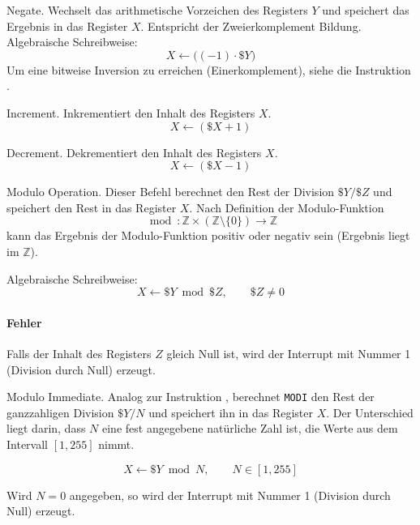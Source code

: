 \glqq Negate\grqq.
Wechselt das arithmetische Vorzeichen des Registers $Y$ und speichert das
Ergebnis in das Register $X$. Entspricht der Zweierkomplement Bildung.
Algebraische Schreibweise:
\[
    X \gets \big( (-1) \cdot \$Y \big)
\]
Um eine bitweise Inversion zu erreichen (Einerkomplement), siehe die
Instruktion .



\glqq Increment\grqq.
Inkrementiert den Inhalt des Registers $X$.
\[
    X \gets ( \$X + 1 )
\]



\glqq Decrement\grqq.
Dekrementiert den Inhalt des Registers $X$.
\[
    X \gets ( \$X - 1 )
\]




Modulo Operation.
Dieser Befehl berechnet den Rest der Division $\$Y/\$Z$ und speichert den Rest
in das Register
$X$. Nach Definition der Modulo-Funktion
\[
  \bmod : \mathds{Z} \times (\mathds{Z}\setminus \{0\})
  \to \mathds{Z}
\]
kann das Ergebnis der Modulo-Funktion positiv oder negativ sein (Ergebnis
liegt im $\mathds{Z}$).


Algebraische Schreibweise:
\[
    X \gets \$Y \bmod \$Z, \qquad \$Z \neq 0
\]

\paragraph{Fehler}
Falls der Inhalt des Registers $Z$ gleich Null ist, wird der Interrupt mit
Nummer 1 (Division durch Null) erzeugt.


\glqq Modulo Immediate\grqq. Analog zur Instruktion , berechnet
\texttt{MODI} den Rest der ganzzahligen Division $\$Y/N$ und speichert ihn in
das Register $X$. Der Unterschied liegt darin, dass $N$ eine fest angegebene
natürliche Zahl ist, die Werte aus dem Intervall $[1, 255]$ nimmt.

\[
    X \gets \$Y \bmod N, \qquad N \in [1, 255]
\]

Wird $N = 0$ angegeben, so wird der Interrupt mit Nummer 1 (Division durch
Null) erzeugt.
